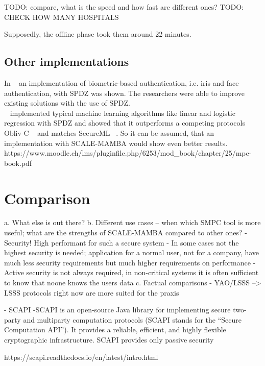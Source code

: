 \documentclass[english,runningheads,a4paper]{llncs}[2018/03/10]
\begin{document}
TODO: compare, what is the speed and how fast are different ones? 
TODO: CHECK HOW MANY HOSPITALS


Supposedly, the offline phase took them around 22 minutes. 

\subsection{Other implementations}

In ~\cite{SEMBA} an implementation of biometric-based authentication, i.e. iris and face authentication, with SPDZ was shown. The researchers were able to improve existing solutions with the use of SPDZ.\\


~\cite{2019arXiv190100329C} implemented typical machine learning algorithms like linear and logistic regression with SPDZ and showed that it outperforms a competing protocols Obliv-C ~\cite{cryptoeprint:2015:1153} and matches SecureML ~\cite{SecureML}. So it can be assumed, that an implementation with SCALE-MAMBA would show even better results.\\


https://www.moodle.ch/lms/pluginfile.php/6253/mod\_book/chapter/25/mpc-book.pdf

\section{Comparison}\label{sec:comparison}


a.	What else is out there?
b.	Different use cases – when which SMPC tool is more useful; what are the strengths of SCALE-MAMBA compared to other ones?
	- Security! High performant for such a secure system
	- In some cases not the highest security is needed; application for a normal user, not for a company, have much less security requirements but much higher requirements on performance
	- Active security is not always required, in non-critical systems it is often sufficient to know that noone knows the users data
c.	Factual comparisons
	- YAO/LSSS --> LSSS protocols right now are more suited for the praxis

	- SCAPI
	-SCAPI is an open-source Java library for implementing secure two-party and multiparty computation protocols (SCAPI stands for the “Secure Computation API”). It provides a reliable, 	efficient, and highly flexible cryptographic infrastructure.
SCAPI provides only passive security

https://scapi.readthedocs.io/en/latest/intro.html
\end{document}
